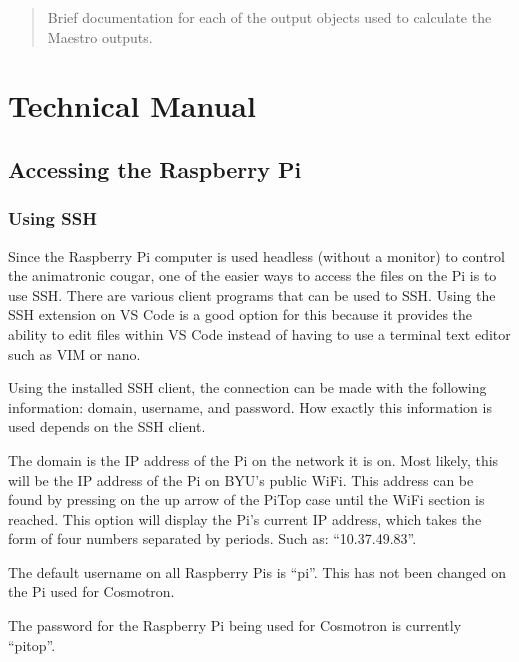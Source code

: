 \documentclass[letterpaper,10pt,english]{sphinxmanual}
\begin{document}
\sphinxAtStartPar
{}
\begin{quote}

\sphinxAtStartPar
Brief documentation for each of the output objects used to calculate the Maestro outputs.
\end{quote}


\chapter{Technical Manual}
\label{\detokenize{technical:technical-manual}}\label{\detokenize{technical::doc}}

\section{Accessing the Raspberry Pi}
\label{\detokenize{access:accessing-the-raspberry-pi}}\label{\detokenize{access::doc}}

\subsection{Using SSH}
\label{\detokenize{access:using-ssh}}
\sphinxAtStartPar
Since the Raspberry Pi computer is used headless (without a monitor) to
control the animatronic cougar, one of the easier ways to access the files
on the Pi is to use SSH. There are various client programs that can be
used to SSH. Using the SSH extension on VS Code is a good option for this
because it provides the ability to edit files within VS Code instead of
having to use a terminal text editor such as VIM or nano.

\sphinxAtStartPar
Using the installed SSH client, the connection can be made with the
following information: domain, username, and password. How exactly this
information is used depends on the SSH client.

\sphinxAtStartPar
The domain is the IP address of the Pi on the network it is on. Most likely,
this will be the IP address of the Pi on BYU’s public WiFi. This address
can be found by pressing on the up arrow of the Pi\sphinxhyphen{}Top case until the WiFi
section is reached. This option will display the Pi’s current IP address,
which takes the form of four numbers separated by periods. Such as:
“10.37.49.83”.

\sphinxAtStartPar
The default username on all Raspberry Pis is “pi”. This has not been changed
on the Pi used for Cosmotron.

\sphinxAtStartPar
The password for the Raspberry Pi being used for Cosmotron is currently
“pi\sphinxhyphen{}top”.
\end{document}
